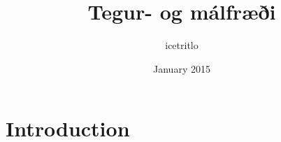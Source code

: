 \documentclass{article}
\title{Tegur- og málfræði}
\author{icetritlo }
\date{January 2015}
\begin{document}
\maketitle

\section{Introduction}
\end{document}
